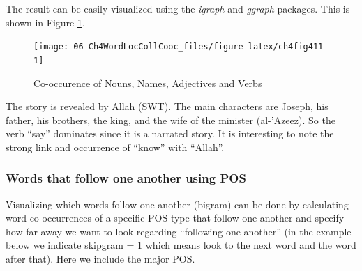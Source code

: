 \documentclass[
]{article}
\newenvironment{Shaded}{\begin{snugshade}}{\end{snugshade}}
\newcommand{\AttributeTok}[1]{\textcolor[rgb]{0.13,0.29,0.53}{#1}}
\newcommand{\DecValTok}[1]{\textcolor[rgb]{0.00,0.00,0.81}{#1}}
\newcommand{\FunctionTok}[1]{\textcolor[rgb]{0.13,0.29,0.53}{\textbf{#1}}}
\newcommand{\NormalTok}[1]{#1}
\newcommand{\OtherTok}[1]{\textcolor[rgb]{0.56,0.35,0.01}{#1}}
\newcommand{\SpecialCharTok}[1]{\textcolor[rgb]{0.81,0.36,0.00}{\textbf{#1}}}
\newcommand{\StringTok}[1]{\textcolor[rgb]{0.31,0.60,0.02}{#1}}
\begin{document}
\normalsize

The result can be easily visualized using the \emph{igraph} and \emph{ggraph} packages. This is shown in Figure \ref{fig:ch4fig411}.

\begin{figure}

{\centering \texttt{[image: 06-Ch4WordLocCollCooc\_files/figure-latex/ch4fig411-1]} 

}

\caption{Co-occurence of Nouns, Names, Adjectives and Verbs}\label{fig:ch4fig411}
\end{figure}

The story is revealed by Allah (SWT). The main characters are Joseph, his father, his brothers, the king, and the wife of the minister (al-'Azeez). So the verb ``say'' dominates since it is a narrated story. It is interesting to note the strong link and occurrence of ``know'' with ``Allah''.

\hypertarget{words-that-follow-one-another-using-pos}{%
\subsubsection{Words that follow one another using POS}\label{words-that-follow-one-another-using-pos}}

Visualizing which words follow one another (bigram) can be done by calculating word co-occurrences of a specific POS type that follow one another and specify how far away we want to look regarding ``following one another'' (in the example below we indicate skipgram = 1 which means look to the next word and the word after that). Here we include the major POS.

\footnotesize

\begin{Shaded}
\end{Shaded}

\normalsize
\end{document}
